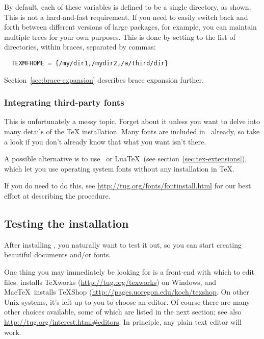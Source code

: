 \documentclass{article}
\begin{document}
By default, each of these variables is defined to be a single directory,
as shown.  This is not a hard-and-fast requirement.  If you need to
easily switch back and forth between different versions of large
packages, for example, you can maintain multiple trees for your own
purposes.  This is done by setting  to the
list of directories, within braces, separated by commas:

\begin{verbatim}
  TEXMFHOME = {/my/dir1,/mydir2,/a/third/dir}
\end{verbatim}

Section~\ref{sec:brace-expansion} describes brace expansion further.


\subsubsection{Integrating third-party fonts}

This is unfortunately a messy topic.  Forget about it unless you want to
delve into many details of the \TeX{} installation.  Many fonts are
included in \TL\ already, so take a look if you don't already know 
that what you want isn't there.

A possible alternative is to use \XeTeX\ or Lua\TeX\ (see
section~\ref{sec:tex-extensions}), which let you use operating system
fonts without any installation in \TeX.

If you do need to do this, see
\url{http://tug.org/fonts/fontinstall.html} for our best effort at
describing the procedure.


\subsection{Testing the installation}
\label{sec:test-install}

After installing \TL{}, you naturally want to test it out, so you can
start creating beautiful documents and\slash or fonts.

One thing you may immediately be looking for is a front-end with which to
edit files.  \TL{} installs \TeX{}works (\url{http://tug.org/texworks})
on Windows, and Mac\TeX\ installs TeXShop
(\url{http://pages.uoregon.edu/koch/texshop}.  On other Unix systems,
it's left up to you to choose an editor.  Of course there are many other
choices available, some of which are listed in the next section; see
also \url{http://tug.org/interest.html#editors}.  In principle, any
plain text editor will work.
\end{document}

